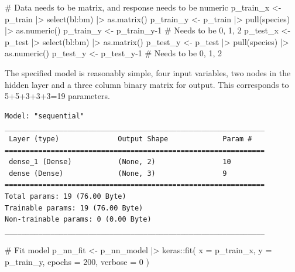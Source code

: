 \documentclass[
  letterpaper,
]{krantz}
\newenvironment{Shaded}{\begin{snugshade}}{\end{snugshade}}
\newcommand{\AttributeTok}[1]{\textcolor[rgb]{0.40,0.45,0.13}{#1}}
\newcommand{\CommentTok}[1]{\textcolor[rgb]{0.37,0.37,0.37}{#1}}
\newcommand{\DecValTok}[1]{\textcolor[rgb]{0.68,0.00,0.00}{#1}}
\newcommand{\FunctionTok}[1]{\textcolor[rgb]{0.28,0.35,0.67}{#1}}
\newcommand{\NormalTok}[1]{\textcolor[rgb]{0.00,0.23,0.31}{#1}}
\newcommand{\OtherTok}[1]{\textcolor[rgb]{0.00,0.23,0.31}{#1}}
\newcommand{\SpecialCharTok}[1]{\textcolor[rgb]{0.37,0.37,0.37}{#1}}
\begin{document}
\begin{Shaded}
\begin{Highlighting}[]
\CommentTok{\# Data needs to be matrix, and response needs to be numeric}
\NormalTok{p\_train\_x }\OtherTok{\textless{}{-}}\NormalTok{ p\_train }\SpecialCharTok{|\textgreater{}}
  \FunctionTok{select}\NormalTok{(bl}\SpecialCharTok{:}\NormalTok{bm) }\SpecialCharTok{|\textgreater{}}
  \FunctionTok{as.matrix}\NormalTok{()}
\NormalTok{p\_train\_y }\OtherTok{\textless{}{-}}\NormalTok{ p\_train }\SpecialCharTok{|\textgreater{}} \FunctionTok{pull}\NormalTok{(species) }\SpecialCharTok{|\textgreater{}} \FunctionTok{as.numeric}\NormalTok{() }
\NormalTok{p\_train\_y }\OtherTok{\textless{}{-}}\NormalTok{ p\_train\_y}\DecValTok{{-}1} \CommentTok{\# Needs to be 0, 1, 2}
\NormalTok{p\_test\_x }\OtherTok{\textless{}{-}}\NormalTok{ p\_test }\SpecialCharTok{|\textgreater{}}
  \FunctionTok{select}\NormalTok{(bl}\SpecialCharTok{:}\NormalTok{bm) }\SpecialCharTok{|\textgreater{}}
  \FunctionTok{as.matrix}\NormalTok{()}
\NormalTok{p\_test\_y }\OtherTok{\textless{}{-}}\NormalTok{ p\_test }\SpecialCharTok{|\textgreater{}} \FunctionTok{pull}\NormalTok{(species) }\SpecialCharTok{|\textgreater{}} \FunctionTok{as.numeric}\NormalTok{() }
\NormalTok{p\_test\_y }\OtherTok{\textless{}{-}}\NormalTok{ p\_test\_y}\DecValTok{{-}1} \CommentTok{\# Needs to be 0, 1, 2}
\end{Highlighting}
\end{Shaded}

The specified model is reasonably simple, four input variables, two
nodes in the hidden layer and a three column binary matrix for output.
This corresponds to 5+5+3+3+3=19 parameters.

\begin{verbatim}
Model: "sequential"
______________________________________________________________
 Layer (type)              Output Shape             Param #   
==============================================================
 dense_1 (Dense)           (None, 2)                10        
 dense (Dense)             (None, 3)                9         
==============================================================
Total params: 19 (76.00 Byte)
Trainable params: 19 (76.00 Byte)
Non-trainable params: 0 (0.00 Byte)
______________________________________________________________
\end{verbatim}

\begin{Shaded}
\begin{Highlighting}[]
\CommentTok{\# Fit model}
\NormalTok{p\_nn\_fit }\OtherTok{\textless{}{-}}\NormalTok{ p\_nn\_model }\SpecialCharTok{|\textgreater{}}\NormalTok{ keras}\SpecialCharTok{::}\FunctionTok{fit}\NormalTok{(}
  \AttributeTok{x =}\NormalTok{ p\_train\_x, }
  \AttributeTok{y =}\NormalTok{ p\_train\_y,}
  \AttributeTok{epochs =} \DecValTok{200}\NormalTok{,}
  \AttributeTok{verbose =} \DecValTok{0}
\NormalTok{)}
\end{Highlighting}
\end{Shaded}
\end{document}

